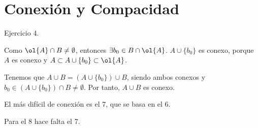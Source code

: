 \section{Conexión y Compacidad}\label{sec:Rel3}

\begin{ejercicio}
    Ejercicio 4.

    Como $\ol{A}\cap B\neq \emptyset$, entonces $\exists b_0\in B\cap \ol{A}$. $A\cup \{b_0\}$ es conexo, porque $A$ es conexo y $A\subset A\cup \{b_0\}\subset \ol{A}$.

    Tenemos que $A\cup B = \left(A\cup \{b_0\}\right)\cup B$, siendo ambos conexos y $b_0\in \left(A\cup \{b_0\}\right)\cap B\neq \emptyset$. Por tanto, $A\cup B$ es conexo. 
\end{ejercicio}



El más difícil de conexión es el 7, que se basa en el 6.

Para el 8 hace falta el 7.

\begin{ejercicio}
    
\end{ejercicio}